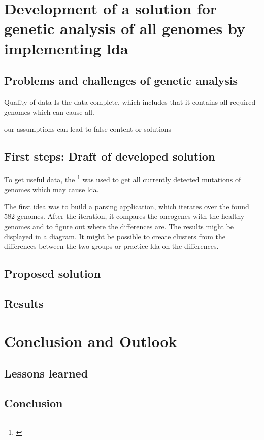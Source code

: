 \chapter{Development of a solution for genetic analysis of \gls{all} genomes by implementing \gls{lda}}\label{development}
\section{Problems and challenges of genetic analysis}\label{problems_challenges}
Quality of data 
Is the data complete, which includes that it contains all required genomes which can cause \gls{all}.



our assumptions can lead to false content or solutions 

\section{First steps: Draft of developed solution}\label{draft}

To get useful data, the \footnote{\autocite{ncbi}} was used to get all currently detected mutations of genomes which may cause \gls{lda}.

The first idea was to build a parsing application, which iterates over the found 582 genomes. After the iteration, it compares the oncogenes with the healthy genomes and to figure out where the differences are. The results might be displayed in a diagram. It might be possible to create clusters from the differences between the two groups or practice \gls{lda} on the differences.

\section{Proposed solution}\label{proposed_solution}
\section{Results}\label{results}


\chapter{Conclusion and Outlook}\label{conclusion_outlook}
\section{Lessons learned}\label{lessons_learned}
\section{Conclusion}\label{conclusion}
